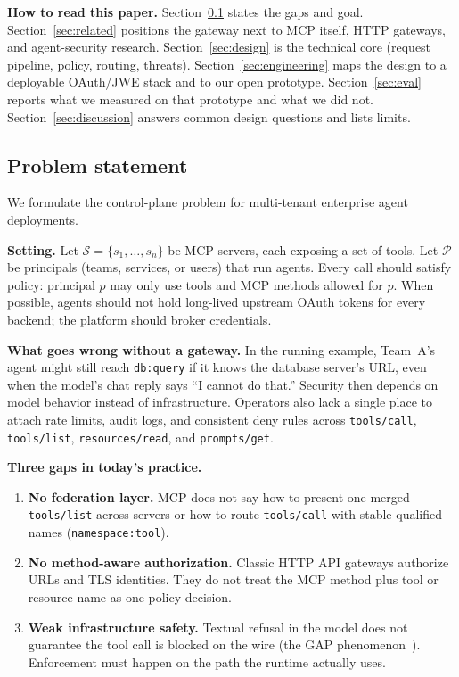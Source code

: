 \documentclass[11pt]{article}
\newcommand{\code}[1]{\texttt{#1}}
\begin{document}
\textbf{How to read this paper.}
Section~\ref{sec:problem} states the gaps and goal.
Section~\ref{sec:related} positions the gateway next to MCP itself, HTTP gateways, and agent-security research.
Section~\ref{sec:design} is the technical core (request pipeline, policy, routing, threats).
Section~\ref{sec:engineering} maps the design to a deployable OAuth/JWE stack and to our open prototype.
Section~\ref{sec:eval} reports what we measured on that prototype and what we did not.
Section~\ref{sec:discussion} answers common design questions and lists limits.

\subsection{Problem statement}
\label{sec:problem}

We formulate the control-plane problem for multi-tenant enterprise agent deployments.

\textbf{Setting.}
Let $\mathcal{S}=\{s_1,\ldots,s_n\}$ be MCP servers, each exposing a set of tools.
Let $\mathcal{P}$ be principals (teams, services, or users) that run agents.
Every call should satisfy policy: principal $p$ may only use tools and MCP methods allowed for $p$.
When possible, agents should not hold long-lived upstream OAuth tokens for every backend; the platform should broker credentials.

\textbf{What goes wrong without a gateway.}
In the running example, Team~A's agent might still reach \code{db:query} if it knows the database server's URL, even when the model's chat reply says ``I cannot do that.''
Security then depends on model behavior instead of infrastructure.
Operators also lack a single place to attach rate limits, audit logs, and consistent deny rules across \code{tools/call}, \code{tools/list}, \code{resources/read}, and \code{prompts/get}.

\textbf{Three gaps in today's practice.}
\begin{enumerate}[leftmargin=*, itemsep=0.25em]
  \item \textbf{No federation layer.} MCP does not say how to present one merged \code{tools/list} across servers or how to route \code{tools/call} with stable qualified names (\code{namespace:tool}).
  \item \textbf{No method-aware authorization.} Classic HTTP API gateways authorize URLs and TLS identities. They do not treat the MCP method plus tool or resource name as one policy decision.
  \item \textbf{Weak infrastructure safety.} Textual refusal in the model does not guarantee the tool call is blocked on the wire (the GAP phenomenon~\cite{gap2026}). Enforcement must happen on the path the runtime actually uses.
\end{enumerate}
\end{document}
